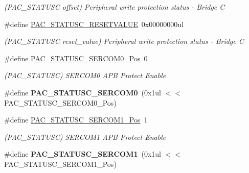 \begin{DoxyCompactItemize}
\begin{DoxyCompactList}\small\item\em (P\+A\+C\+\_\+\+S\+T\+A\+T\+U\+S\+C offset) Peripheral write protection status -\/ Bridge C \end{DoxyCompactList}\item 
\hypertarget{group___s_a_m_l21___p_a_c_ga98914e088261a85a15041e76cc321990}{}\#define \hyperlink{group___s_a_m_l21___p_a_c_ga98914e088261a85a15041e76cc321990}{P\+A\+C\+\_\+\+S\+T\+A\+T\+U\+S\+C\+\_\+\+R\+E\+S\+E\+T\+V\+A\+L\+U\+E}~0x00000000ul\label{group___s_a_m_l21___p_a_c_ga98914e088261a85a15041e76cc321990}

\begin{DoxyCompactList}\small\item\em (P\+A\+C\+\_\+\+S\+T\+A\+T\+U\+S\+C reset\+\_\+value) Peripheral write protection status -\/ Bridge C \end{DoxyCompactList}\item 
\hypertarget{group___s_a_m_l21___p_a_c_ga03224ff7c3d231d59936ed93c2057b2e}{}\#define \hyperlink{group___s_a_m_l21___p_a_c_ga03224ff7c3d231d59936ed93c2057b2e}{P\+A\+C\+\_\+\+S\+T\+A\+T\+U\+S\+C\+\_\+\+S\+E\+R\+C\+O\+M0\+\_\+\+Pos}~0\label{group___s_a_m_l21___p_a_c_ga03224ff7c3d231d59936ed93c2057b2e}

\begin{DoxyCompactList}\small\item\em (P\+A\+C\+\_\+\+S\+T\+A\+T\+U\+S\+C) S\+E\+R\+C\+O\+M0 A\+P\+B Protect Enable \end{DoxyCompactList}\item 
\hypertarget{group___s_a_m_l21___p_a_c_ga03a73cd725438e59431ca9a61913eeaa}{}\#define {\bfseries P\+A\+C\+\_\+\+S\+T\+A\+T\+U\+S\+C\+\_\+\+S\+E\+R\+C\+O\+M0}~(0x1ul $<$$<$ P\+A\+C\+\_\+\+S\+T\+A\+T\+U\+S\+C\+\_\+\+S\+E\+R\+C\+O\+M0\+\_\+\+Pos)\label{group___s_a_m_l21___p_a_c_ga03a73cd725438e59431ca9a61913eeaa}

\item 
\hypertarget{group___s_a_m_l21___p_a_c_ga0d925aa72059e70c783ce4c485faf265}{}\#define \hyperlink{group___s_a_m_l21___p_a_c_ga0d925aa72059e70c783ce4c485faf265}{P\+A\+C\+\_\+\+S\+T\+A\+T\+U\+S\+C\+\_\+\+S\+E\+R\+C\+O\+M1\+\_\+\+Pos}~1\label{group___s_a_m_l21___p_a_c_ga0d925aa72059e70c783ce4c485faf265}

\begin{DoxyCompactList}\small\item\em (P\+A\+C\+\_\+\+S\+T\+A\+T\+U\+S\+C) S\+E\+R\+C\+O\+M1 A\+P\+B Protect Enable \end{DoxyCompactList}\item 
\hypertarget{group___s_a_m_l21___p_a_c_gaf0eea59741f833e320a06d7ce18dd414}{}\#define {\bfseries P\+A\+C\+\_\+\+S\+T\+A\+T\+U\+S\+C\+\_\+\+S\+E\+R\+C\+O\+M1}~(0x1ul $<$$<$ P\+A\+C\+\_\+\+S\+T\+A\+T\+U\+S\+C\+\_\+\+S\+E\+R\+C\+O\+M1\+\_\+\+Pos)\label{group___s_a_m_l21___p_a_c_gaf0eea59741f833e320a06d7ce18dd414}


\end{DoxyCompactItemize}
